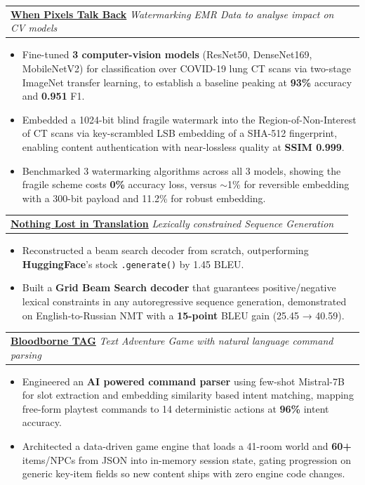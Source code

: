\documentclass[letterpaper,11pt]{article}
\makeatletter
\newcommand{\BulletItems}[1]{
  \item
    \begin{itemize}[label={-}, leftmargin=*, labelsep=0.3em, topsep=0pt, partopsep=0pt, itemsep=0pt, parsep=0pt]
      \small #1
    \end{itemize}\vspace{-5pt}
}
\newcommand{\SLSubheadingItemLink}[4]{
  \vspace{-2pt}\item
    \begin{tabular*}{0.97\textwidth}[t]{l@{\extracolsep{\fill}}r}
      \textbf{\href{#2}{#1}} \textbar{} \textit{\small #3} & {\small #4} \\
    \end{tabular*}\vspace{-7pt}
}
\newcommand{\swallow}[1]{}
\makeatother
\begin{document}
    \SLSubheadingItemLink
      {When Pixels Talk Back}{https://github.com/anupreetsingh/When-Pixels-Talk-Back}
      {Watermarking EMR Data to analyse impact on CV models}{} %
    \BulletItems{
      \item Fine-tuned \textbf{3 computer-vision models} (ResNet50, DenseNet169, MobileNetV2) for classification over \swallow{2,481}COVID-19 lung CT scans via two-stage ImageNet transfer learning, to establish a baseline peaking at \textbf{93\%} accuracy and \textbf{0.951} F1.
      \item Embedded a 1024-bit blind fragile watermark into the Region-of-Non-Interest of CT scans via key-scrambled LSB embedding of a SHA-512 fingerprint, enabling content authentication with near-lossless quality at \textbf{SSIM 0.999}.
      \item Benchmarked 3 watermarking algorithms across all 3 models, showing the fragile scheme costs \textbf{0\%} accuracy loss, versus $\sim$1\% for reversible embedding with a 300-bit payload and 11.2\% for robust embedding.    
    }
    \SLSubheadingItemLink
      {Nothing Lost in Translation}{https://github.com/anupreetsingh/Nothing-Lost-in-Translation}
      {Lexically constrained Sequence Generation}{} %
    \BulletItems{
      \item Reconstructed a beam search decoder from scratch, outperforming \textbf{HuggingFace}'s stock \texttt{.generate()} by 1.45 BLEU.
      \item Built a \textbf{Grid Beam Search decoder} that guarantees positive/negative lexical constraints in any autoregressive sequence generation, demonstrated on English-to-Russian NMT with a \textbf{15-point} BLEU gain (25.45 → 40.59).
    }
    \SLSubheadingItemLink
      {Bloodborne TAG}{https://github.com/anupreetsingh/Bloodborne-TAG}
      {Text Adventure Game with natural language command parsing}{} %
    \BulletItems{
      \item Engineered an \textbf{AI powered command parser} using few-shot Mistral-7B for slot extraction and embedding similarity based intent matching, mapping free-form playtest commands to 14 deterministic actions at \textbf{96\%} intent accuracy.
      \item Architected a data-driven game engine that loads a 41-room world and \textbf{60+} items/NPCs from JSON into in-memory session state, gating progression on generic key-item fields so new content ships with zero engine code changes.
    }
\end{document}
